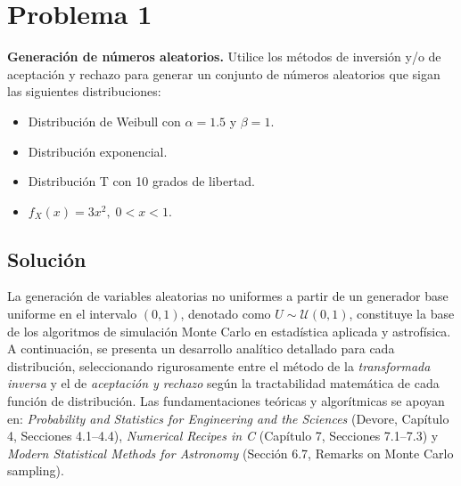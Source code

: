 \documentclass[12pt]{article}
\begin{document}
\section{Problema 1}
\textbf{Generación de números aleatorios.} Utilice los métodos de inversión y/o de aceptación y rechazo para generar un conjunto de números aleatorios que sigan las siguientes distribuciones:
\begin{itemize}
\item Distribución de Weibull con $\alpha = 1.5$ y $\beta = 1$.
\item Distribución exponencial.
\item Distribución T con 10 grados de libertad.
\item $f_X(x) = 3x^2, \; 0 < x < 1$.
\end{itemize}

\subsection{Solución}
La generación de variables aleatorias no uniformes a partir de un generador base uniforme en el intervalo $(0,1)$, denotado como $U \sim \mathcal{U}(0,1)$, constituye la base de los algoritmos de simulación Monte Carlo en estadística aplicada y astrofísica. A continuación, se presenta un desarrollo analítico detallado para cada distribución, seleccionando rigurosamente entre el método de la \textit{transformada inversa} y el de \textit{aceptación y rechazo} según la tractabilidad matemática de cada función de distribución. Las fundamentaciones teóricas y algorítmicas se apoyan en: \textit{Probability and Statistics for Engineering and the Sciences} (Devore, Capítulo 4, Secciones 4.1--4.4), \textit{Numerical Recipes in C} (Capítulo 7, Secciones 7.1--7.3) y \textit{Modern Statistical Methods for Astronomy} (Sección 6.7, Remarks on Monte Carlo sampling).
\end{document}
